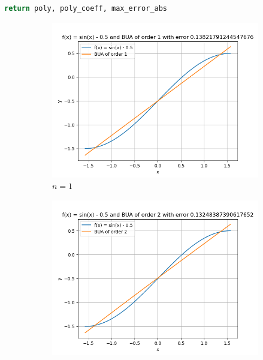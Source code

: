 \documentclass[conference,onecolumn]{IEEEtran}
\begin{document}
\begin{enumerate}[label=\arabic{enumi}.]
\begin{enumerate}
\begin{lstlisting}[language=Python]
      return poly, poly_coeff, max_error_abs
                        \end{lstlisting}
                        \begin{figure}[H]
                              \centering
                              \begin{subfigure}{0.49\linewidth}
                                    \centering
                                    \includegraphics[width=\linewidth]{figs/Q1_c_poly_1.png}
                                    \caption{$n = 1$}
                              \end{subfigure}
                              \begin{subfigure}{0.49\linewidth}
                                    \centering
                                    \includegraphics[width=\linewidth]{figs/Q1_c_poly_2.png}

\end{subfigure}
\end{figure}
\end{enumerate}
\end{enumerate}
\end{document}
